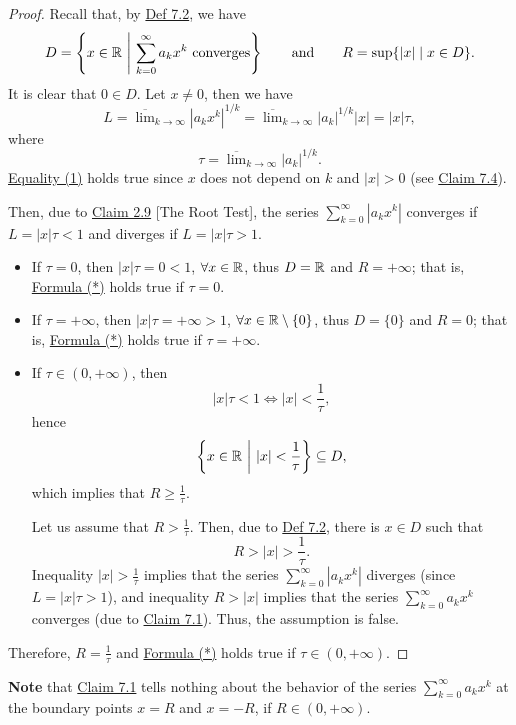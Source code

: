 \begin{proof}
Recall that, by \hyperref[def:7.2]{Def 7.2}, we have
\[
D=\left\{x\in\R\ \middle|\ \sum_{k=0}^{\infty}a_kx^k\text{ converges}\right\}
\qquad\text{and}\qquad
R=\sup\{|x|\mid x\in D\}.
\]
It is clear that $0\in D$.
Let $x\neq0$, then we have
\[
L
=
\overline{\lim}_{k\to\infty}|a_kx^k|^{1/k}
=
\overline{\lim}_{k\to\infty}|a_k|^{1/k}|x|
=
|x|\tau,
\tag{1}\label{eq:7:1:2}
\]
where
\[
\tau=\overline{\lim}_{k\to\infty}|a_k|^{1/k}.
\]
\hyperref[eq:7:1:2]{Equality (1)} holds true since $x$ does not depend on $k$ and $|x|>0$ (see \hyperref[claim:7.4]{Claim 7.4}).

Then, due to \hyperref[claim:2.9]{Claim 2.9} [The Root Test], the series $\sum_{k=0}^{\infty}|a_kx^k|$ converges if $L=|x|\tau<1$ and diverges if $L=|x|\tau>1$.

\begin{itemize}
    \item If $\tau=0$, then $|x|\tau=0<1$, $\forall x\in\mathbb{R}$, thus $D=\mathbb{R}$ and $R=+\infty$; that is, \hyperref[eq:7:star:1]{Formula (*)} holds true if $\tau=0$.

    \item If $\tau=+\infty$, then $|x|\tau=+\infty>1$, $\forall x\in\mathbb{R}\setminus\{0\}$, thus $D=\{0\}$ and $R=0$; that is, \hyperref[eq:7:star:1]{Formula (*)} holds true if $\tau=+\infty$.

    \item If $\tau\in(0,+\infty)$, then
    \[
    |x|\tau<1
    \Longleftrightarrow
    |x|<\frac{1}{\tau},
    \]
    hence
    \[
    \left\{x\in\R\ \middle|\ |x|<\frac{1}{\tau}\right\}\subseteq D,
    \]
    which implies that $R\geq\frac{1}{\tau}$.

    Let us assume that $R>\frac{1}{\tau}$. Then, due to \hyperref[def:7.2]{Def 7.2}, there is $x\in D$ such that
    \[
    R>|x|>\frac{1}{\tau}.
    \]
    Inequality $|x|>\frac{1}{\tau}$ implies that the series $\sum_{k=0}^{\infty}|a_kx^k|$ diverges (since $L=|x|\tau>1$), and inequality $R>|x|$ implies that the series $\sum_{k=0}^{\infty}a_kx^k$ converges (due to \hyperref[claim:7.1]{Claim 7.1}).
    Thus, the assumption is false.
\end{itemize}
Therefore, $R=\frac{1}{\tau}$ and \hyperref[eq:7:star:1]{Formula (*)} holds true if $\tau\in(0,+\infty)$.
\end{proof}

\textbf{Note} that \hyperref[claim:7.1]{Claim 7.1} tells nothing about the behavior of the series $\sum_{k=0}^{\infty}a_kx^k$ at the boundary points $x=R$ and $x=-R$, if $R\in(0,+\infty)$.

